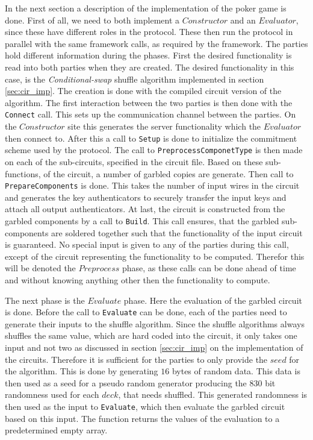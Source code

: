 \documentclass[twoside,11pt,openright]{report}
\newcommand{\CS}{\textit{Conditional-swap} }
\begin{document}
In the next section a description of the implementation of the poker game is done. First of all, we need to both implement a $Constructor$ and an $Evaluator$, since these have different roles in the protocol. These then run the protocol in parallel with the same framework calls, as required by the framework. The parties hold different information during the phases. First the desired functionality is read into both parties when they are created. The desired functionality in this case, is the \CS shuffle algorithm implemented in section \ref{sec:cir_imp}. The creation is done with the compiled circuit version of the algorithm. The first interaction between the two parties is then done with the \verb|Connect| call. This sets up the communication channel between the parties. On the $Constructor$ site this generates the server functionality which the $Evaluator$ then connect to. After this a call to \verb|Setup| is done to initialize the commitment scheme used by the protocol. The call to \verb|PreprocessComponetType| is then made on each of the sub-circuits, specified in the circuit file. Based on these sub-functions, of the circuit, a number of garbled copies are generate. Then call to \verb|PrepareComponents| is done. This takes the number of input wires in the circuit and generates the key authenticators to securely transfer the input keys and attach all output authenticators. At last, the circuit is constructed from the garbled components by a call to \verb|Build|. This call ensures, that the garbled sub-components are soldered together such that the functionality of the input circuit is guaranteed. No special input is given to any of the parties during this call, except of the circuit representing the functionality to be computed. Therefor this will be denoted the $Preprocess$ phase, as these calls can be done ahead of time and without knowing anything other then the functionality to compute.

The next phase is the $Evaluate$ phase. Here the evaluation of the garbled circuit is done. Before the call to \verb|Evaluate| can be done, each of the parties need to generate their inputs to the shuffle algorithm. Since the shuffle algorithms always shuffles the same value, which are hard coded into the circuit, it only takes one input and not two as discussed in section \ref{sec:cir_imp} on the implementation of the circuits. Therefore it is sufficient for the parties to only provide the $seed$ for the algorithm. This is done by generating $16$ bytes of random data. This data is then used as a seed for a pseudo random generator producing the $830$ bit randomness used for each $deck$, that needs shuffled. This generated randomness is then used as the input to \verb|Evaluate|, which then evaluate the garbled circuit based on this input. The function returns the values of the evaluation to a predetermined empty array.
\end{document}
